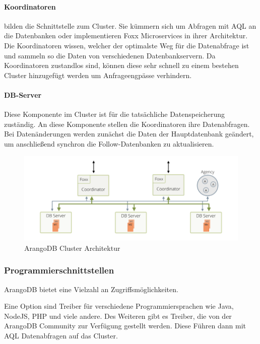 \paragraph{Koordinatoren} bilden die Schnittstelle zum Cluster. Sie kümmern sich um Abfragen mit \ac{AQL} an die Datenbanken oder implementieren Foxx Microservices in ihrer Architektur. Die Koordinatoren wissen, welcher der optimalste Weg für die Datenabfrage ist und sammeln so die Daten von verschiedenen Datenbankservern. Da Koordinatoren zustandlos sind, können diese sehr schnell zu einem bestehen Cluster hinzugefügt werden um Anfrageengpässe verhindern. \cite{ADB_clusterarch}
\paragraph{DB-Server} 
Diese Komponente im Cluster ist für die tatsächliche Datenspeicherung zuständig. An diese Komponente stellen die Koordinatoren ihre Datenabfragen. Bei Datenänderungen werden zunächst die Daten der Hauptdatenbank geändert, um anschließend synchron die Follow-Datenbanken zu aktualisieren.

\begin{figure}[htbp] 
  	\centering
     \includegraphics[width=1\textwidth]{./images/cluster-arch.png}
 	\caption{ArangoDB Cluster Architektur \cite{ADB_clusterarch}}
  \label{fig:ClusterArch}
\end{figure}


\subsubsection{Programmierschnittstellen}
ArangoDB bietet eine Vielzahl an Zugriffsmöglichkeiten.

Eine Option sind Treiber für verschiedene Programmiersprachen wie Java, NodeJS, PHP und viele andere. Des Weiteren gibt es Treiber, die von der ArangoDB Community zur Verfügung gestellt werden. \cite{ADB_driver} Diese Führen dann mit \ac{AQL} Datenabfragen auf das Cluster. 

